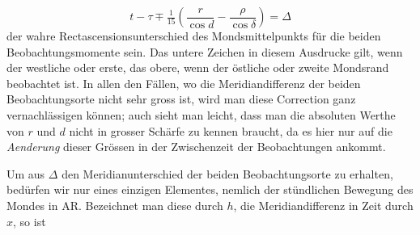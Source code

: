 \[
t-\tau \mp \tfrac{1}{15}\left(\frac{r}{\cos d}-\frac{\rho}{\cos\delta}\right) = \Delta
\]
\noindent der wahre Rectascensionsunterschied des Mondsmittelpunkts für die beiden
Beobachtungsmomente sein. Das untere Zeichen in diesem Ausdrucke gilt, wenn der westliche
oder erste, das obere, wenn der östliche oder zweite Mondsrand beobachtet ist. In allen den
Fällen, wo die Meridiandifferenz der beiden Beobachtungsorte nicht sehr gross ist, wird man
diese Correction ganz vernachlässigen können; auch
%
sieht man leicht, dass man die absoluten Werthe von $r$ und $d$ nicht in grosser Schärfe zu
kennen braucht, da es hier nur auf die \emph{Aenderung} dieser Grössen in der Zwischenzeit der
Beobachtungen ankommt.

Um aus $\Delta$ den Meridianunterschied der beiden Beobachtungsorte zu erhalten, bedürfen wir
nur eines einzigen Elementes, nemlich der stündlichen Bewegung des Mondes in AR. Bezeichnet
man diese durch $h$, die Meridiandifferenz in Zeit durch $x$, so ist

